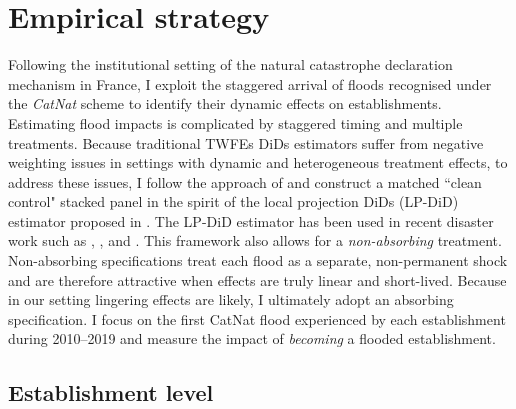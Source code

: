 
\chapter{Empirical strategy}
\label{ch: empirical_strategy}



Following the institutional setting of the natural catastrophe declaration mechanism in France, I exploit the staggered arrival of floods recognised under the \textit{CatNat} scheme to identify their dynamic effects on establishments. Estimating flood impacts is complicated by staggered timing and multiple treatments. Because traditional TWFEs DiDs estimators suffer from negative weighting issues in settings with dynamic and heterogeneous treatment effects, to address these issues,  I follow the approach of \cite{wing2024stacked} and construct a matched ``clean control" stacked panel in the spirit of the local projection DiDs (LP-DiD) estimator proposed in \cite{dube2023local}. The LP-DiD estimator has been used in recent disaster work such as \citet{roth2020local}, \citet{gallagher2024natural}, and \citet{castro2024weathering}. This framework also allows for a \textit{non-absorbing} treatment. Non-absorbing specifications treat each flood as a separate, non-permanent shock and are therefore attractive when effects are truly linear and short-lived. Because in our setting lingering effects are likely, I ultimately adopt an absorbing specification. I focus on the first CatNat flood experienced by each establishment during 2010–2019 and measure the impact of \textit{becoming} a flooded establishment.


\section{Establishment level}

